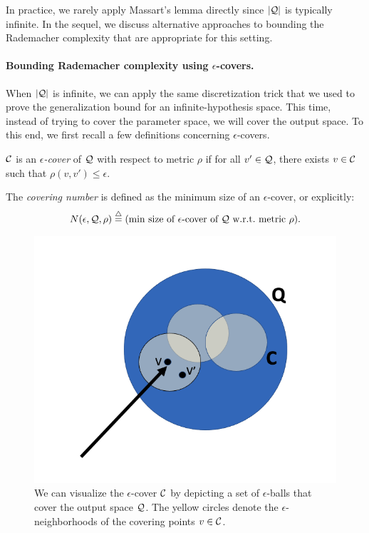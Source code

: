 In practice, we rarely apply Massart's lemma directly since $|\mathcal Q|$ is typically infinite. In the sequel, we discuss alternative approaches to bounding the Rademacher complexity that are appropriate for this setting.

\paragraph{Bounding Rademacher complexity using $\epsilon$-covers.}
When $|\mathcal Q|$ is infinite, we can apply the same discretization trick that we used to prove the generalization bound for an infinite-hypothesis space. This time, instead of trying to cover the parameter space, we will cover the output space. To this end, we first recall a few definitions concerning $\epsilon$-covers.

\begin{definition}
$\mathcal C$ is an \emph{$\epsilon$-cover} of $\mathcal Q$ with respect to metric $\rho$ if for all $v' \in \mathcal Q$, there exists $v \in \mathcal C $ such that $\rho(v,v')\le \epsilon$.
\end{definition}

\begin{definition}
The \emph{covering number} is defined as the minimum size of an $\epsilon$-cover, or explicitly:
\begin{align}
    N(\epsilon, \mathcal Q, \rho) \overset \triangle = (\text{min size of $\epsilon$-cover of $\mathcal Q$ w.r.t.\ metric $\rho$}).
\end{align}
\end{definition}

\begin{figure}[h]
	\begin{center}
		\includegraphics[width=.5\textwidth]{figures/onestep_bound.png}
	\end{center}
	\caption{We can visualize the $\epsilon$-cover $\mathcal C$ by depicting a set of $\epsilon$-balls that cover the output space $\mathcal Q$. The yellow circles denote the $\epsilon$-neighborhoods of the covering points $v \in \mathcal C$.}
	\label{lec9:fig:eps-cover}
\end{figure}

